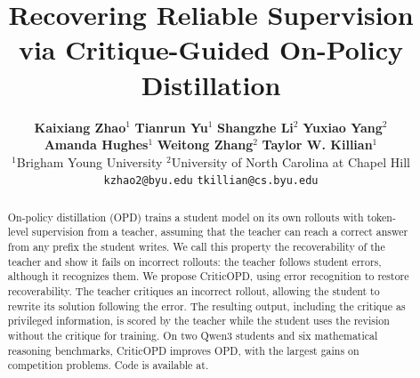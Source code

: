 \documentclass[11pt]{article}
\title{
Recovering Reliable Supervision via Critique-Guided On-Policy Distillation
}
\author{
\textbf{Kaixiang Zhao}$^{1}$ \quad \textbf{Tianrun Yu}$^{1}$ \quad \textbf{Shangzhe Li}$^{2}$ \quad \textbf{Yuxiao Yang}$^{2}$ \\
\textbf{Amanda Hughes}$^{1}$ \quad \textbf{Weitong Zhang}$^{2}$ \quad \textbf{Taylor W. Killian}$^{1}$ \\
$^{1}$Brigham Young University \quad $^{2}$University of North Carolina at Chapel Hill \\
\texttt{kzhao2@byu.edu} \quad \texttt{tkillian@cs.byu.edu}}
\newcommand{\ours}{CriticOPD}
\theoremstyle{remark}
\theoremstyle{plain}
\newcommand{\1}{\mathbf{1}}
\begin{document}
\maketitle




\begin{abstract}
On-policy distillation (OPD) trains a student model on its own rollouts with token-level supervision from a teacher, assuming that the teacher can reach a correct answer from any prefix the student writes. We call this property the recoverability of the teacher and show it fails on incorrect rollouts: the teacher follows student errors, although it recognizes them. We propose CriticOPD, using error recognition to restore recoverability. The teacher critiques an incorrect rollout, allowing the student to rewrite its solution following the error. The resulting output, including the critique as privileged information, is scored by the teacher while the student uses the revision without the critique for training. On two Qwen3 students and six mathematical reasoning benchmarks, CriticOPD improves OPD, with the largest gains on competition problems. Code is available at.
\end{abstract}






\end{document}
